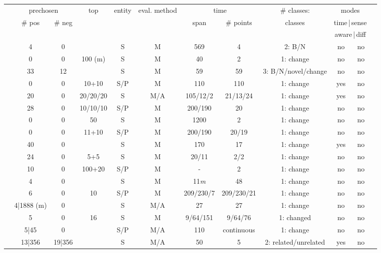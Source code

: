 \documentclass[output=paper]{langsci/langscibook}
\begin{document}
\begin{table}
\footnotesize
\begin{tabular}{@{}l@{}c@{}cc@{}cc@{}cc@{}cccc@{}}
\lsptoprule
&\multicolumn{2}{c}{prechosen} & top & entity &eval. method & \multicolumn{2}{c}{time} & \# classes: & 
\multicolumn{2}{c}{modes}\\
& \# pos & \# neg & &   &  & span & \# points & classes & \multicolumn{2}{c}{{time\,|\,sense}}\\
&  &  & &   &  &  &  & & \multicolumn{2}{c}{{aware\,|\,diff}}\\
\midrule
{\citet{sagi-etal-2009-semantic}} & 4 & 0 & &S& M&  569 & 4 & 
2: B/N& no&no  \\
%
{\citet{gulordava-baroni-2011-distributional}} & 0&0 & 100 (m) & S & M & 40 & 2 & 
1: change & no &no\\
%
{\citet{tang2013}}& 33 & 12& & S & M & 59 & 59 & 
3: B/N/novel/change & no & no\\
%
{\citet{kim-etal-2014-temporal}} & 0 & 0& 10+10 & S/P & M & 110 & 110 &  
1: change & yes & no\\
%
{\citet{kulkarni2015statistically}}& 20 & 0 &20/20/20 & S & M/A & 105/12/2 & 21/13/24 & 
1: change & yes&no\\
%
{\citet{hamilton-etal-2016-diachronic}} & 28 & 0 & 10/10/10 & S/P & M  & 200/190 & 20& 
1: change & no&no\\ 
%
{\citet{rodda2016panta-journal}} & 0 & 0 & 50  & S & M & 1200 & 2 & %
1: change& no & no\\
%
{\citet{eger-mehler-2016-linearity}} & 0 & 0 & 11+10 & S/P & M & 200/190 & 20/19 & 
1: change & no & no\\
{\citet{basilediachronic}} & 40 & 0 & & S & M & 170& 17 & 
1: change & yes & no\\
%
{\citet{wordsaremalleable}} & 24 & 0& 5+5 &S & M & 20/11& 2/2&  
1: change & no & no\\
{\citet{japnloanwords} }& 10 & 0 & 100+20 & S/P & M & - & 2 &  
1: change & no & no\\
%
{\citet{kahmannnh17}} & 4 & 0 & & S & M & 11\textit{m} & 48 &  
1: change& no & no\\
%
{\citet{bamler17}} & 6 & 0 & 10 & S/P& M & 209/230/7 & 209/230/21 &  
1: change & no & no\\
%
{\citet{yao2018dynamic}} & 4|1888 (m) & 0 & & S & M/A & 27 & 27 &  
1: change & no & no\\
\citet{rudolphb18-dynamicembforlangevo} &5 & 0& 16 & S & M & 9/64/151 & 9/64/76&  
1: changed & no & no\\
{\citet{rosenfeld-erk-2018-deep}} & 5|45 & 0 & & S/P & M/A & 110 & continuous &  
1: change & no & no\\
\citet{dubossarsky-etal-2019-time} & 13|356  & 19|356 & & S & M/A & 50 & 5 & 
2: related/unrelated & yes & no\\
\midrule
\end{tabular}
\end{table}
\end{document}
